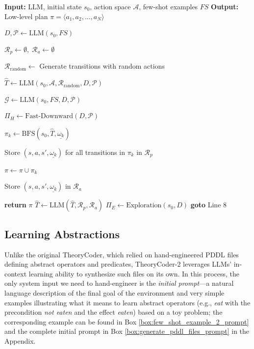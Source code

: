 \documentclass{article}
\theoremstyle{plain}
\theoremstyle{definition}
\theoremstyle{remark}
\begin{document}
\begin{algorithm}[t]
  \caption{TheoryCoder-2}
  \label{alg:theorycoder_algo}
  \begin{algorithmic}[1]
    \STATE \textbf{Input:} LLM, initial state $s_0$, action space $\mathcal{A}$, few-shot examples $FS$
    \STATE \textbf{Output:} Low-level plan $\pi = \langle a_1, a_2, \dots, a_N \rangle$

    \STATE $D, \mathcal{P} \gets \text{LLM}(s_0, FS)$ 

    \STATE $\mathcal{R}_p \gets \emptyset,\; \mathcal{R}_a \gets \emptyset$ 

    \STATE $\mathcal{R}_{\text{random}} \gets$ Generate transitions with random actions

    \STATE $\hat{T} \gets \text{LLM}(s_0, \mathcal{A}, \mathcal{R}_{\text{random}}, D, \mathcal{P})$ 

    \STATE $\mathcal{G} \gets \text{LLM}(s_0, FS, D, \mathcal{P})$ 

    \STATE $\Pi_H \gets \text{Fast-Downward}(D, \mathcal{P})$ 

      \STATE $\pi_k \gets \mathrm{BFS}(s_0, \hat{T}, \underline{\omega_k})$ 

      \STATE Store $(s, a, s', \underline{\omega_k})$ for all transitions in $\pi_k$ in $\mathcal{R}_p$

      \STATE $\pi \gets \pi \cup \pi_k$ 

        \STATE Store $(s, a, s', \underline{\omega_k})$ in $\mathcal{R}_a$
      \ENDFOR
    \ENDFOR

      \STATE \textbf{return} $\pi$
    \ELSE
        \STATE $\hat{T} \gets \text{LLM}(\hat{T}, \mathcal{R}_p, \mathcal{R}_a)$ 
      \ELSE
        \STATE $\Pi_E \gets \text{Exploration}(s_0, D)$ 
        \STATE \textbf{goto} Line 8 
      \ENDIF
    \ENDIF
  \end{algorithmic}
\end{algorithm}

\subsection{Learning Abstractions}
\label{sec:abstraction_learning}

Unlike the original TheoryCoder, which relied on hand-engineered PDDL files defining abstract operators and predicates, TheoryCoder-2 leverages LLMs' in-context learning ability to synthesize such files on its own.
In this process, the only system input we need to hand-engineer is the \textit{initial prompt}---a natural language description of the final goal of the environment and very simple examples illustrating what it means to learn abstract operators (e.g., \textit{eat} with the precondition \textit{not eaten} and the effect \textit{eaten}) based on a toy problem; the corresponding example can be found in Box \ref{box:few_shot_example_2_prompt} and the complete initial prompt in Box \ref{box:generate_pddl_files_prompt} in the Appendix.
\end{document}
